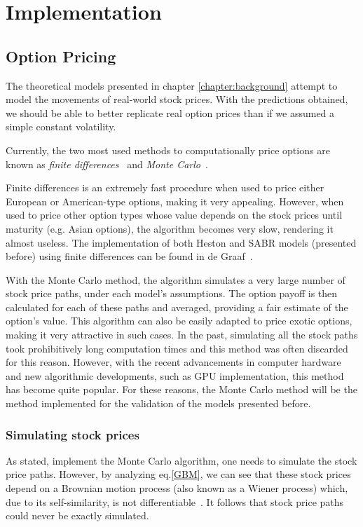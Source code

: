 \chapter{Implementation}
\label{chapter:implementation}
\section{Option Pricing}
\label{section:Option Pricing}
The theoretical models presented in chapter \ref{chapter:background} attempt to model the movements of real-world stock prices. With the predictions obtained, we should be able to better replicate real option prices than if we assumed a simple constant volatility.

Currently, the two most used methods to computationally price options are known as \emph{finite differences}~\cite{Hull} and \emph{Monte Carlo}~\cite{Glasserman}.

Finite differences is an extremely fast procedure when used to price either European or American-type options, making it very appealing. However, when used to price other option types whose value depends on the stock prices until maturity (e.g. Asian options), the algorithm becomes very slow, rendering it almost useless.
The implementation of both Heston and SABR models (presented before) using finite differences can be found in de Graaf~\cite{deGraaf}.


With the Monte Carlo method, the algorithm simulates a very large number of stock price paths, under each model's assumptions. The option payoff is then calculated for each of these paths and averaged, providing a fair estimate of the option's value. This algorithm can also be easily adapted to price exotic options, making it very attractive in such cases.
In the past, simulating all the stock paths took prohibitively long computation times and this method was often discarded for this reason. However, with the recent advancements in computer hardware and new algorithmic developments, such as GPU implementation, this method has become quite popular.
For these reasons, the Monte Carlo method will be the method implemented for the validation of the models presented before.


\subsection{Simulating stock prices}
\label{subsection:Simulating stock prices}
As stated, implement the Monte Carlo algorithm, one needs to simulate the stock price paths. However, by analyzing eq.\eqref{GBM}, we can see that these stock prices depend on a Brownian motion process (also known as a Wiener process) which, due to its self-similarity, is not differentiable~\cite{Mikosch}. It follows that stock price paths could never be exactly simulated.

